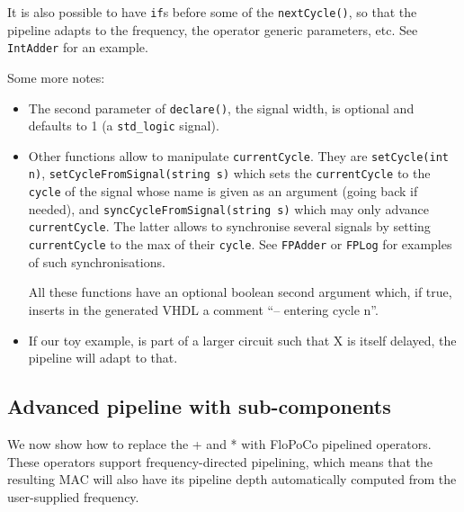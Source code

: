 \documentclass{article}
\begin{document}
It is also possible to have \verb!if!s before some of the
\verb!nextCycle()!, so that the pipeline adapts to the frequency, the
operator generic parameters, etc. See \verb!IntAdder! for an example.

Some more notes:
\begin{itemize}
\item The second parameter of \verb!declare()!, the signal width, is
  optional and defaults to 1 (a \verb!std_logic! signal).

\item Other functions allow to manipulate \verb!currentCycle!. They
  are \verb!setCycle(int n)!, \verb!setCycleFromSignal(string s)!
  which sets the \verb!currentCycle! to the \verb!cycle! of the
  signal whose name is given as an argument (going back if needed),
  and \verb!syncCycleFromSignal(string s)! which may only advance \verb!currentCycle!. The latter allows to synchronise
  several signals by setting \verb!currentCycle! to the max of their
  \verb!cycle!. See \verb!FPAdder! or \verb!FPLog! for examples of
  such synchronisations. 

All these functions have an optional boolean
  second argument which, if true, inserts in the generated VHDL a
  comment ``-- entering cycle n''.


\item If our toy example, is part of a larger circuit such that X is
  itself delayed, the pipeline will adapt to that.

\end{itemize}

\subsection{Advanced pipeline with sub-components}

We now show how to replace the + and * with FloPoCo pipelined
operators. These operators support frequency-directed pipelining,
which means that the resulting MAC will also have its pipeline depth
automatically computed from the user-supplied frequency.
\end{document}
